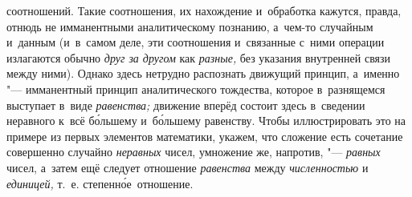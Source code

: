 соотношений. Такие соотношения, их нахождение и~обработка кажутся, правда,
отнюдь не имманентными аналитическому познанию, а~чем-то
случайным и~данным (и~в~самом деле, эти соотношения и~связанные с~ними
операции излагаются обычно {\em друг за другом} как {\em разные,} без
указания внутренней связи между ними). Однако здесь нетрудно распознать
движущий принцип, а~именно "--- имманентный принцип
аналитического тождества, которое в~разнящемся выступает в~виде
{\em равенства;} движение
вперёд состоит здесь в~сведении неравного к~всё б\'{о}льшему и~б\'{о}льшему
равенству. Чтобы иллюстрировать это на примере из первых элементов
математики, укажем, что сложение есть сочетание совершенно случайно
{\em неравных} чисел, умножение же, напротив, "--- {\em равных}
чисел, а~затем ещё следует отношение {\em равенства} между {\em численностью}
и {\em единицей,} т.~е. степенн\'{о}е~отношение.

